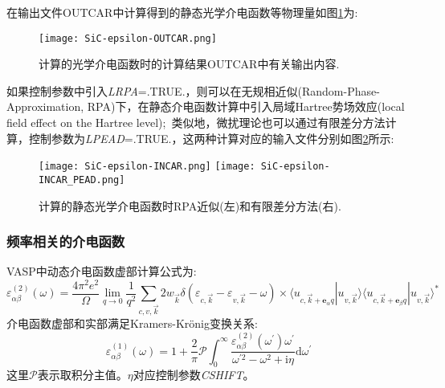 在输出文件\textrm{OUTCAR}中计算得到的静态光学介电函数等物理量如图\ref{SiC-Epsilon-OUTCAR}为:~
\begin{figure}[h!]
\centering
\texttt{[image: SiC-epsilon-OUTCAR.png]}
\caption{\small \textrm{计算的光学介电函数时的计算结果\textrm{OUTCAR}中有关输出内容.}}%
\label{SiC-Epsilon-OUTCAR}
\end{figure}

如果控制参数中引入\textrm{\textit{LRPA}=.TRUE.}，则可以在无规相近似(\textrm{Random-Phase-Approximation, RPA})下，在静态介电函数计算中引入局域\textrm{Hartree}势场效应(\textrm{local field effect on the Hartree level});~类似地，微扰理论也可以通过有限差分方法计算，控制参数为\textrm{\textit{LPEAD}=.TRUE.}，这两种计算对应的输入文件分别如图\ref{SiC-epsilon-INCARs}所示:~
\begin{figure}[h!]
\centering
\texttt{[image: SiC-epsilon-INCAR.png]}
\texttt{[image: SiC-epsilon-INCAR\_PEAD.png]}
\caption{\small \textrm{计算的静态光学介电函数时\textrm{RPA}近似(左)和有限差分方法(右).}}%
\label{SiC-epsilon-INCARs}
\end{figure}
\subsubsection{\rm{频率相关的介电函数}}
\textrm{VASP}中动态介电函数虚部计算公式为:
\begin{displaymath}
	\varepsilon_{\alpha\beta}^{(2)}(\omega)=\dfrac{4\pi^2e^2}{\Omega}\lim_{q\rightarrow 0}\frac1{q^2}\sum_{c,v,\vec k}2w_{\vec k}\delta(\varepsilon_{c,\vec k}-\varepsilon_{v,\vec k}-\omega)\times\langle u_{c,\vec k+\mathbf{e}_{\alpha}q}|u_{v,\vec k}\rangle\langle u_{c,\vec k+\mathbf{e}_{\beta}q}|u_{v,\vec k}\rangle^{\ast}
\end{displaymath}
介电函数虚部和实部满足\textrm{Kramers-Kr\"onig}变换关系:
\begin{displaymath}
	\varepsilon_{\alpha\beta}^{(1)}(\omega)=1+\dfrac2{\pi}\mathcal{P}\int_0^{\infty}\dfrac{\varepsilon_{\alpha\beta}^{(2)}(\omega^{\prime})\omega^{\prime}}{\omega^{\prime2}-\omega^2+\mathrm{i}\eta}\mathrm{d}{\omega^{\prime}}
\end{displaymath}
这里$\mathcal{P}$表示取积分主值。$\eta$对应控制参数\textit{CSHIFT}。

